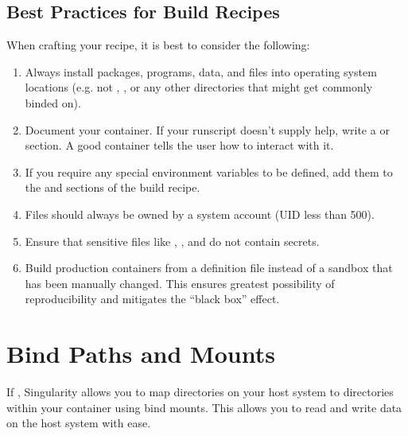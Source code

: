 \documentclass[letterpaper,10pt,english]{sphinxmanual}
\begin{document}
\section{Best Practices for Build Recipes}
\label{\detokenize{definition_files:best-practices-for-build-recipes}}
When crafting your recipe, it is best to consider the following:
\begin{enumerate}
\item {} 
Always install packages, programs, data, and files into operating system
locations (e.g. not ,  , or any other directories that might
get commonly binded on).

\item {} 
Document your container. If your runscript doesn’t supply help, write a
 or  section. A good container tells the user how to
interact with it.

\item {} 
If you require any special environment variables to be defined, add them to
the  and  sections of the build recipe.

\item {} 
Files should always be owned by a system account (UID less than 500).

\item {} 
Ensure that sensitive files like , , and
 do not contain secrets.

\item {} 
Build production containers from a definition file  instead of a sandbox that
has been manually changed. This ensures greatest possibility of
reproducibility and mitigates the “black box” effect.

\end{enumerate}


\chapter{Bind Paths and Mounts}
\label{\detokenize{bind_paths_and_mounts:bind-paths-and-mounts}}\label{\detokenize{bind_paths_and_mounts:id1}}\label{\detokenize{bind_paths_and_mounts::doc}}\label{\detokenize{bind_paths_and_mounts:sec-bindpaths}}
If ,
Singularity allows you to map directories on your host system to directories
within your container using bind mounts. This allows you to read and write data
on the host system with ease.
\end{document}
